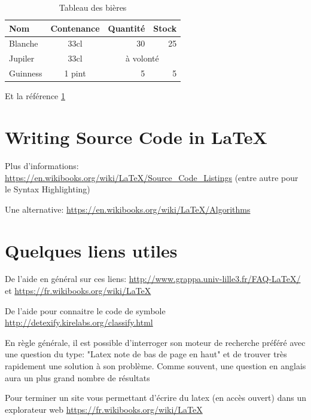 \documentclass[a4paper,11pt]{article}
\begin{document}
	\vspace{1cm}
	
	
	\begin{table}[h]
		\centering
	\begin{tabular}{|p{3cm}|c|r|r|}
		\hline
		Nom & Contenance & Quantité & Stock\\
		\hline
		\hline
		Blanche & 33cl & 30 & 25\\
		\cline{2-2}
		Jupiler & 33cl & \multicolumn{2}{c|}{à volonté}\\
		\cline{3-4}
		Guinness & 1 pint & 5 & 5\\
		\hline
	\end{tabular}
	\caption{Tableau des bières}
	\label{tab:bieres}
	\end{table}
	
	Et la référence \ref{tab:bieres}
	
	\newpage
	\section{Writing Source Code in \LaTeX}
	
	
	
	Plus d'informations: \url{https://en.wikibooks.org/wiki/LaTeX/Source_Code_Listings} (entre autre pour le Syntax Highlighting)
	
	Une alternative: \url{https://en.wikibooks.org/wiki/LaTeX/Algorithms}

\newpage
\section{Quelques liens utiles}
De l'aide en général sur ces liens:
\url{http://www.grappa.univ-lille3.fr/FAQ-LaTeX/} et \url{https://fr.wikibooks.org/wiki/LaTeX}

De l'aide pour connaitre le code de symbole
\url{http://detexify.kirelabs.org/classify.html}

En règle générale, il est possible d'interroger son moteur de recherche préféré avec une question du type: "Latex note de bas de page en haut" et de trouver très rapidement une solution à son problème. Comme souvent, une question en anglais aura un plus grand nombre de résultats

Pour terminer un site vous permettant d'écrire du latex (en accès ouvert) dans un explorateur web \url{https://fr.wikibooks.org/wiki/LaTeX}
\end{document}

